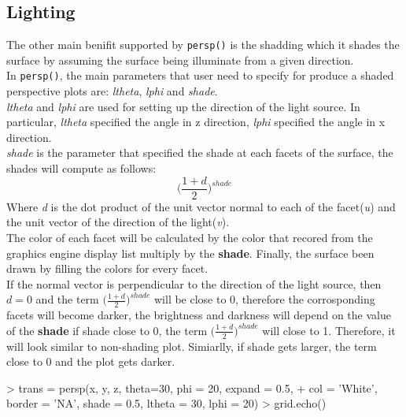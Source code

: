 \documentclass[paper=a4, fontsize=11pt]{report}
\begin{document}
\subsection{Lighting}
The other main benifit supported by \texttt{persp()} is the shadding which it shades the surface by assuming the surface being illuminate from a given direction.\\

In \texttt{persp()}, the main parameters that user need to specify for produce a shaded perspective plots are: \textit{ltheta}, \textit{lphi} and \textit{shade}.\\

\textit{ltheta} and \textit{lphi} are used for setting up the direction of the light source. In particular, \textit{ltheta} specified the angle in z direction, \textit{lphi} specified the angle in x direction. \\

\textit{shade} is the parameter that specified the shade at each facets of the surface, the shades will compute as follows:
\begin{equation}
\big(\frac{1 + d}{2}\big)^{shade}
\end{equation}
Where \textit{d} is the dot product of the unit vector normal to each of the facet(\textit{u}) and the unit vector of the direction of the light(\textit{v}). \\

The color of each facet will be calculated by the color that recored from the graphics engine display list multiply by the \textbf{shade}. Finally, the surface been drawn by filling the colors for every facet.\\

If the normal vector is perpendicular to the direction of the light source, then $d = 0$ and the term $\big(\frac{1 + d}{2}\big)^{shade}$ will be close to 0, therefore the corrosponding facets will become darker, the brightness and darkness will depend on the value of the \textbf{shade} if shade close to 0, the term $\big(\frac{1 + d}{2}\big)^{shade}$ will close to 1. Therefore, it will look similar to non-shading plot. Simiarlly, if shade gets larger, the term close to 0 and the plot gets darker.

\begin{Schunk}
\begin{Sinput}
> trans = persp(x, y, z, theta=30, phi = 20, expand = 0.5,
+  col = 'White', border = 'NA', shade = 0.5, ltheta = 30, lphi = 20)
> grid.echo()
\end{Sinput}
\end{Schunk}
\end{document}
